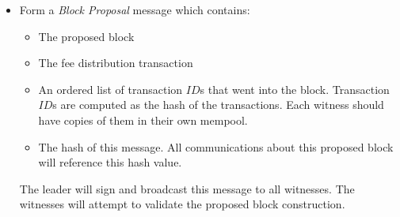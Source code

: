 \documentclass[8pt,fleqn,openany]{book}
\begin{document}
\begin{itemize}
{    \begin{itemize}
      \item {Block Type ID, 1}
      \item {Version number}
      \item {Epoch number}
      \item {Previous block hash, computed as the hash of the block header of the current blockchain tip block}
      \item {$\gamma_{blk} = \sum{\gamma_{adj}}$, the sum of all $\gamma_{adj}$ terms found in the block transactions, which includes the $\gamma_{adj}$ from the leader's fee distribution transaction.}
      \item {Root hash of TXIN Merkle tree}
      \item {Root hash of TXOUT Merkle tree}
      \item {BLS Multi-signature, to be filled in as a result of the consensus on the block.\footnote{We are using pairing-based cryptography to support the use of short, fast, BLS signatures. BLS signatures allow the formation of multi-signatures in one pass over the witness pool.}}
      \item {Bitmap of signers in the multi-signature}
    \end{itemize}}

  The initial contents of the BLS multi-signature slots should be zero filled and, even after being filled in, never contribute to the computation of any \textit{block header hash}. All other slots are concatenated to form a header hash pre-image. But when a full hash of the block is formed for messaging purposes, the entire block, consisting of block header and block body, are considered for the hash pre-image.

  \item{Form a \textit{Block Proposal} message which contains:
    \begin{itemize}
      \item {The proposed block}
      \item {The fee distribution transaction}
      \item {An ordered list of transaction $ID$s that went into the block. Transaction $ID$s are computed as the hash of the transactions. Each witness should have copies of them in their own mempool.}
      \item {The hash of this message. All communications about this proposed block will reference this hash value.}
    \end{itemize}
  The leader will sign and broadcast this message to all witnesses. The witnesses will attempt to validate the proposed block construction.}
\end{itemize}
\end{document}
